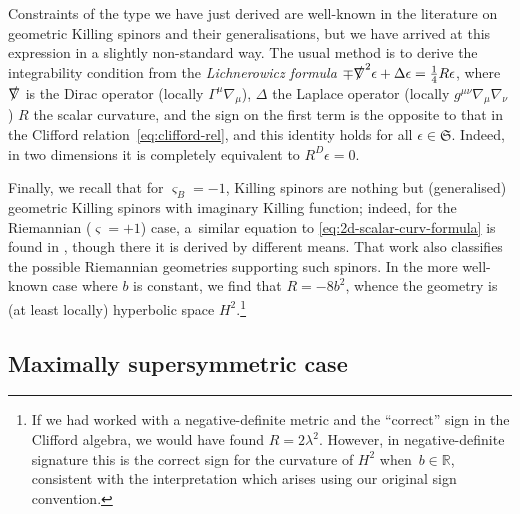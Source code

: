 \documentclass[10pt,a4paper]{amsart}
\numberwithin{equation}{section}
\newcommand{\fS}{\mathfrak{S}}
\newcommand{\RR}{\mathbb{R}}
\newcommand{\1}{\mathbbm{1}}
\begin{document}
Constraints of the type we have just derived are well-known in the literature on geometric Killing spinors and their generalisations, but we have arrived at this expression in a slightly non-standard way. The usual method is to derive the integrability condition from the \emph{Lichnerowicz formula} \cite{Hijazi2001,Lichnerowicz1963}
$\mp\slashed\nabla^2\epsilon + \Delta\epsilon = \frac{1}{4}R\epsilon$,
where $\slashed\nabla$ is the Dirac operator (locally $\Gamma^\mu\nabla_\mu$), $\Delta$ the Laplace operator (locally $g^{\mu\nu}\nabla_\mu\nabla_\nu$) $R$ the scalar curvature, and the sign on the first term is the opposite to that in the Clifford relation~\eqref{eq:clifford-rel}, and this identity holds for all $\epsilon\in\fS$. Indeed, in two dimensions it is completely equivalent to $R^D\epsilon=0$.

Finally, we recall that for $\varsigma_B=-1$, Killing spinors are nothing but (generalised) geometric Killing spinors with imaginary Killing function; indeed, for the Riemannian ($\varsigma=+1$) case, a~similar equation to \eqref{eq:2d-scalar-curv-formula} is found in \cite[equation~(5)]{Rademacher1990}, though there it is derived by different means. That work also classifies the possible Riemannian geometries supporting such spinors. In the more well-known case where $b$ is constant, we find that $R=-8b^2$, whence the geometry is (at least locally) hyperbolic space $H^2$.\footnote{If we had worked with a negative-definite metric and the ``correct'' sign in the Clifford algebra, we would have found $R=2\lambda^2$. However, in negative-definite signature this is the correct sign for the curvature of $H^2$ when~${b\in \RR}$, consistent with the interpretation which arises using our original sign convention.}

\subsection{Maximally supersymmetric case}
\end{document}
